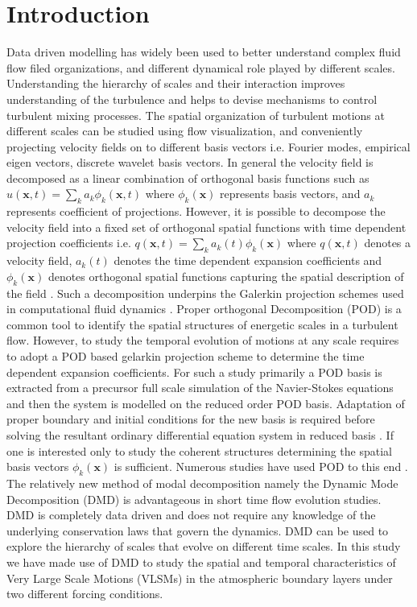 \documentclass{article}
\begin{document}
\section{Introduction}
Data driven modelling has widely been used to better understand complex fluid flow filed organizations, and different dynamical role played by different scales. Understanding the hierarchy of scales and their interaction improves understanding of the turbulence and helps to devise mechanisms to control turbulent mixing processes. The spatial organization of turbulent motions at different scales can be studied using flow visualization, and conveniently projecting velocity fields on to different basis vectors i.e. Fourier modes, empirical eigen vectors, discrete wavelet basis vectors. In general the velocity field is decomposed as a linear combination of orthogonal basis functions such as $u(\mathbf{x},t) = \sum_k a_k \phi_k(\mathbf{x},t)$ where $\phi_k(\mathbf{x})$ represents basis vectors, and $a_k$ represents coefficient of projections. However, it is possible to decompose the velocity field into a fixed set of orthogonal spatial functions with time dependent projection coefficients  i.e. $q(\mathbf{x},t)=\sum_k a_k(t) \phi_k(\mathbf{x})$  where $q(\mathbf{x},t)$ denotes a velocity field, $a_k(t)$ denotes the time dependent expansion coefficients and $\phi_k(\mathbf{x})$ denotes orthogonal spatial functions capturing the spatial description of the field \citep{taira_arxiv_2017}. Such a decomposition underpins the Galerkin projection schemes used in computational fluid dynamics \citep{rowley2004model, armbruster_chaos_94}. Proper orthogonal Decomposition (POD) is a common tool to identify the spatial structures of energetic scales in a turbulent flow. However, to study the temporal evolution of motions at any scale requires to adopt a POD based gelarkin projection scheme to determine the time dependent expansion coefficients. For such a study primarily a POD basis is extracted from a precursor full scale simulation of the Navier-Stokes equations and then the system is modelled on the reduced order POD basis. Adaptation of proper boundary and initial conditions for the new basis is required before solving the resultant ordinary differential equation system in reduced basis \citep[eg. ][]{stabile2017advances}. If one is interested only to study the  coherent structures  determining the spatial basis vectors $\phi_k(\mathbf{x})$ is sufficient. Numerous studies have used POD to this end \citep[eg. ][]{li_bouzeid_blm_2011,muld_compFluids_2012}. The relatively new method of modal decomposition namely the Dynamic Mode Decomposition (DMD) is advantageous in short time flow evolution studies. DMD is completely data driven and does not require any knowledge of the underlying conservation laws that govern the dynamics. DMD can be used to explore the hierarchy of scales that evolve on different time scales. In this study we have made use of DMD to study the spatial and temporal characteristics of Very Large Scale Motions (VLSMs) in the atmospheric boundary layers under two different forcing conditions. 
\end{document}
